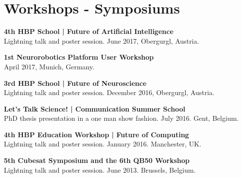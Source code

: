\documentclass[a4paper]{deedy-resume} %
\begin{document}
{\begin{minipage}[b]{0.42\linewidth}
\end{minipage}

\vspace{10pt}

\begin{minipage}[b]{0.53\linewidth}
	
	\section{Workshops -  Symposiums}
	
	\vspace{5pt}
	\textbf{4th HBP School | Future of Artificial Intelligence} \\
	Lightning talk and poster session. June 2017, Obergurgl, Austria.
	
	\vspace{5pt}
	\textbf{1st Neurorobotics Platform User Workshop} \\
	April 2017, Munich, Germany.
	
	\vspace{5pt}
	\textbf{3rd HBP School | Future of Neuroscience} \\
	Lightning talk and poster session. December 2016, Obergurgl, Austria.
	
	\vspace{5pt}
	\textbf{Let's Talk Science! | Communication Summer School} \\
	PhD thesis presentation in a one man show fashion. July 2016. Gent, Belgium.
	\vspace{5pt}
	
	\textbf{4th HBP Education Workshop | Future of Computing} \\
	Lightning talk and poster session. January 2016. Manchester, UK.
	
	\vspace{5pt}
	\textbf{5th Cubesat Symposium and the 6th QB50 Workshop} \\
	Lightning talk and poster session. June 2013. Brussels, Belgium.
	
	\vspace{5pt}
\end{minipage}
\hfill
\begin{minipage}[b]{0.42\linewidth}
			
	

\end{minipage}}
\end{document}
